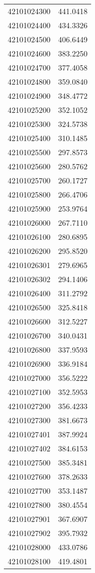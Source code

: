 \begin{longtable}[t]{lr}
42101024300 & 441.0418\\
42101024400 & 434.3326\\
42101024500 & 406.6449\\
42101024600 & 383.2250\\
42101024700 & 377.4058\\
42101024800 & 359.0840\\
42101024900 & 348.4772\\
42101025200 & 352.1052\\
42101025300 & 324.5738\\
42101025400 & 310.1485\\
42101025500 & 297.8573\\
42101025600 & 280.5762\\
42101025700 & 260.1727\\
42101025800 & 266.4706\\
42101025900 & 253.9764\\
42101026000 & 267.7110\\
42101026100 & 280.6895\\
42101026200 & 295.8520\\
42101026301 & 279.6965\\
42101026302 & 294.1406\\
42101026400 & 311.2792\\
42101026500 & 325.8418\\
42101026600 & 312.5227\\
42101026700 & 340.0431\\
42101026800 & 337.9593\\
42101026900 & 336.9184\\
42101027000 & 356.5222\\
42101027100 & 352.5953\\
42101027200 & 356.4233\\
42101027300 & 381.6673\\
42101027401 & 387.9924\\
42101027402 & 384.6153\\
42101027500 & 385.3481\\
42101027600 & 378.2633\\
42101027700 & 353.1487\\
42101027800 & 380.4554\\
42101027901 & 367.6907\\
42101027902 & 395.7932\\
42101028000 & 433.0786\\
42101028100 & 419.4801\\

\end{longtable}
